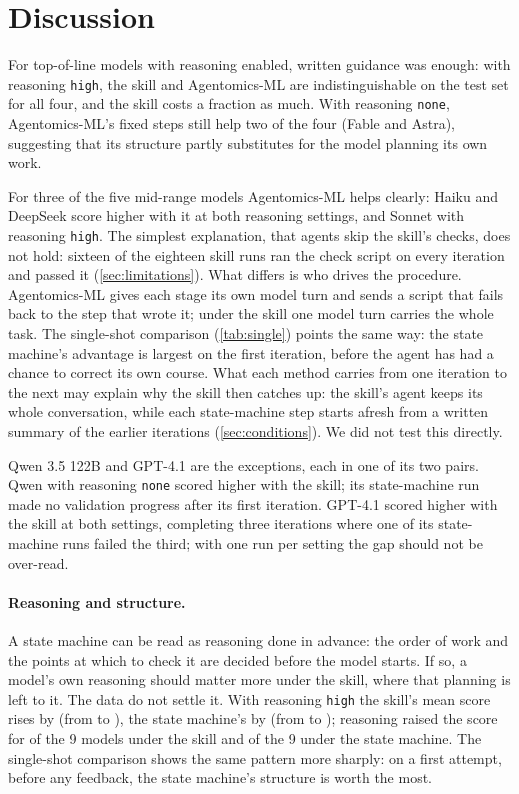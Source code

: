 \section{Discussion}\label{sec:discussion}

For top-of-line models with reasoning enabled, written guidance was enough: with reasoning \texttt{high}, the skill and
Agentomics-ML are indistinguishable on the test set for all four, and the skill costs a fraction as much. With
reasoning \texttt{none}, Agentomics-ML's fixed steps still help two of the four (Fable and Astra),
suggesting that its structure partly substitutes for the model planning its own work.

For three of the five mid-range models Agentomics-ML helps clearly: Haiku and DeepSeek score higher with it
at both reasoning settings, and Sonnet with reasoning \texttt{high}. The simplest explanation, that agents skip the skill's checks, does not hold: sixteen of the eighteen
skill runs ran the check script on every iteration and passed it (\cref{sec:limitations}). What differs is who
drives the procedure. Agentomics-ML gives each stage its own model turn and sends a script that fails back to the
step that wrote it; under the skill one model turn carries the whole task. The single-shot comparison
(\cref{tab:single}) points the same way: the state machine's advantage is largest on the first iteration, before the
agent has had a chance to correct its own course. What each method carries from one iteration to the next may explain
why the skill then catches up: the skill's agent keeps its whole conversation, while each state-machine step starts
afresh from a written summary of the earlier iterations (\cref{sec:conditions}). We did not test this directly.

Qwen 3.5 122B and GPT-4.1 are the exceptions, each in one of its two pairs. Qwen with reasoning \texttt{none} scored higher
with the skill; its state-machine run made no validation progress after its first iteration. GPT-4.1 scored
higher with the skill at both settings, completing three iterations where one of its state-machine runs failed the third; with
one run per setting the gap should not be over-read.

\paragraph{Reasoning and structure.} A state machine can be read as reasoning done in advance: the order of work and
the points at which to check it are decided before the model starts. If so, a model's own reasoning should matter more
under the skill, where that planning is left to it. The data do not settle it. With reasoning
\texttt{high} the skill's mean score rises by \SkillReasonGain{} (from \SkillNoneMean{} to \SkillHighMean), the state
machine's by \SmReasonGain{} (from \SmNoneMean{} to \SmHighMean); reasoning raised the score for \SkillHighWins{} of the 9 models
under the skill and \SmHighWins{} of the 9 under the state machine. The single-shot comparison shows the same pattern
more sharply: on a first attempt, before any feedback, the state machine's structure is worth the most.

